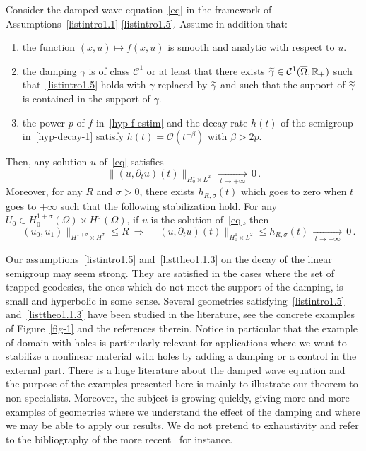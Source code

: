 \documentclass[AHL,Unicode,longabstracts]{cedram}
\newcommand{\RR}{\mathbb{R}}
\newcommand{\Cc}{\mathcal{C}}
\newcommand{\Oc}{\mathcal{O}}
\newcommand*{\alphenumi}{\renewcommand*{\theenumi}{\alph{enumi}}}
\let\oldtilde\tilde
\renewcommand*{\tilde}[1]{\mathchoice{\widetilde{#1}}{\widetilde{#1}}{\oldtilde{#1}}{\oldtilde{#1}}}\let\oldexists\exists
\renewcommand*{\exists}{\mathrel{\oldexists}}
\begin{document}
\begin{theo}\label{th1}
Consider the damped wave equation~\eqref{eq} in the framework of Assumptions~\eqref{listintro1.1}-\eqref{listintro1.5}. Assume in addition that:
\begin{enumerate}\alphenumi
\item \label{listtheo1.1.1}the function $(x,u)\mapsto f(x,u)$ is smooth and analytic with respect to $u$.
\item \label{listtheo1.1.2}the damping $\gamma$ is of class $\Cc^1$ or at least that there exists $\tilde\gamma\in\Cc^1(\overline\Omega,\RR_+)$ such that~\eqref{listintro1.5} holds with $\gamma$ replaced by $\tilde\gamma$ and such that the support of $\tilde\gamma$ is contained in the support of $\gamma$.
\item \label{listtheo1.1.3}the power $p$ of $f$ in~\eqref{hyp-f-estim} and the decay rate $h(t)$ of the semigroup in~\eqref{hyp-decay-1} satisfy $h(t)=\Oc(t^{-\beta})$ with $\beta>2p$.
\end{enumerate}
Then, any solution $u$ of~\eqref{eq} satisfies
\[
\|(u,\partial_t u)(t)\|_{H^1_0\times L^2}\,\xrightarrow[\:t\longrightarrow
+\infty\:]{}\,0\,.
\]
Moreover, for any $R$ and $\sigma>0$, there exists $h_{R,\sigma}(t)$ which goes to zero when $t$ goes to $+\infty$ such that the following stabilization hold. For any $U_0\in H^{1+\sigma}_0(\Omega)\times H^\sigma(\Omega)$, if $u$ is the solution of~\eqref{eq}, then
\[
\|(u_0,u_1)\|_{H^{1+\sigma}\times H^\sigma}\leq
R\:\Longrightarrow\:\|(u,\partial_t u)(t)\|_{H^1_0\times L^2} \leq
h_{R,\sigma}(t)\,\xrightarrow[\:t\longrightarrow +\infty\:]{}\,0\,.
\]
\end{theo}

Our assumptions~\eqref{listintro1.5} and~\eqref{listtheo1.1.3} on the decay of the linear semigroup may seem strong. They are satisfied in the cases where the set of trapped geodesics, the ones which do not meet the support of the damping, is small and hyperbolic in some sense. Several geometries satisfying~\eqref{listintro1.5} and~\eqref{listtheo1.1.3} have been studied in the literature, see the concrete examples of Figure~\ref{fig-1} and the references therein. Notice in particular that the example of domain with holes is particularly relevant for applications where we want to stabilize a nonlinear material with holes by adding a damping or a control in the external part. There is a huge literature about the damped wave equation and the purpose of the examples presented here is mainly to illustrate our theorem to non specialists. Moreover, the subject is growing quickly, giving more and more examples of geometries where we understand the effect of the damping and where we may be able to apply our results. We do not pretend to exhaustivity and refer to the bibliography of the more recent~\cite{Lin} for instance.
\end{document}

